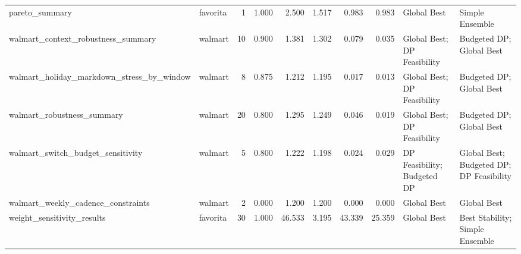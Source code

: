 \begin{table}
{\begin{tabular}{llrrrrrrll}
                              pareto\_summary &     favorita &                       1 &                                     1.000 &                           2.500 &                             1.517 &                         0.983 &                           0.983 &                            Global Best &                            Simple Ensemble \\
          walmart\_context\_robustness\_summary &      walmart &                      10 &                                     0.900 &                           1.381 &                             1.302 &                         0.079 &                           0.035 &            Global Best; DP Feasibility &                   Budgeted DP; Global Best \\
   walmart\_holiday\_markdown\_stress\_by\_window &      walmart &                       8 &                                     0.875 &                           1.212 &                             1.195 &                         0.017 &                           0.013 &            Global Best; DP Feasibility &                   Budgeted DP; Global Best \\
                  walmart\_robustness\_summary &      walmart &                      20 &                                     0.800 &                           1.295 &                             1.249 &                         0.046 &                           0.019 &            Global Best; DP Feasibility &                   Budgeted DP; Global Best \\
           walmart\_switch\_budget\_sensitivity &      walmart &                       5 &                                     0.800 &                           1.222 &                             1.198 &                         0.024 &                           0.029 &            DP Feasibility; Budgeted DP &   Global Best; Budgeted DP; DP Feasibility \\
          walmart\_weekly\_cadence\_constraints &      walmart &                       2 &                                     0.000 &                           1.200 &                             1.200 &                         0.000 &                           0.000 &                            Global Best &                                Global Best \\
                  weight\_sensitivity\_results &     favorita &                      30 &                                     1.000 &                          46.533 &                             3.195 &                        43.339 &                          25.359 &                            Global Best &            Best Stability; Simple Ensemble \\
\bottomrule
\end{tabular}
}

\end{table}
